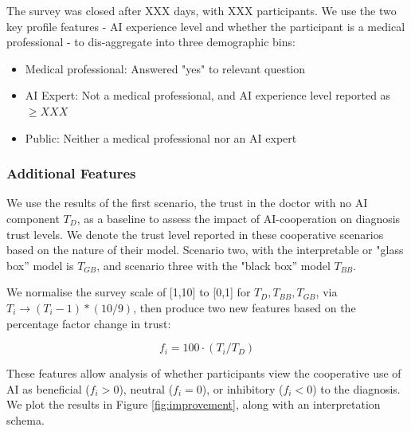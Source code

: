 \documentclass[manuscript,screen,review]{acmart}
\begin{document}



The survey was closed after XXX days, with XXX participants. We use the two key profile features - AI experience level and whether the participant is a medical professional - to dis-aggregate into three demographic bins:

\begin{itemize}
    \item Medical professional: Answered "yes" to relevant question
    \item AI Expert: Not a medical professional, and AI experience level reported as $\geq XXX$
    \item Public: Neither a medical professional nor an AI expert
\end{itemize}

\subsubsection{Additional Features}

We use the results of the first scenario, the trust in the doctor with no AI component $T_D$, as a baseline to assess the impact of AI-cooperation on diagnosis trust levels. We denote the trust level reported in these cooperative scenarios based on the nature of their model. Scenario two, with the interpretable or "glass box'' model is $T_{GB}$, and scenario three with the "black box'' model $T_{BB}$.

We normalise the survey scale of [1,10] to [0,1] for $T_D, T_{BB}, T_{GB}$, via $T_i \rightarrow (T_i - 1) * (10/9)$, then produce two new features based on the percentage factor change in trust:

\begin{equation}
    f_i = 100 \cdot (T_i / T_D)
\end{equation}

These features allow analysis of whether participants view the cooperative use of AI as beneficial ($f_i > 0$), neutral ($f_i = 0$), or inhibitory ($f_i < 0$) to the diagnosis. We plot the results in Figure \ref{fig:improvement}, along with an interpretation schema.
\end{document}
